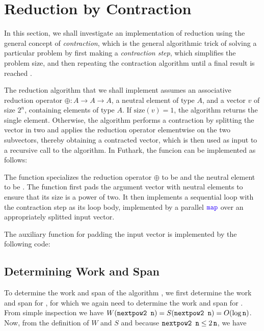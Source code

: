 \documentclass[oneside,11pt]{book}
\newenvironment{wrap}{\vspace{\topskip}\par\noindent\begin{minipage}{\linewidth}}{\end{minipage}\par}
\begin{document}
\section{Reduction by Contraction}

In this section, we shall investigate an implementation of reduction
using the general concept of \emph{contraction}, which is the general
algorithmic trick of solving a particular problem by first making a
\emph{contraction step}, which simplifies the problem size, and then
repeating the contraction algorithm until a final result is reached
\cite{algdesign:parseq2016}.

The reduction algorithm that we shall implement assumes an associative
reduction operator $\oplus : A \rightarrow A \rightarrow A$, a neutral
element of type $A$, and a vector $v$ of size $2^n$, containing
elements of type $A$. If $\mathrm{size}(v) = 1$, the algorithm returns
the single element. Otherwise, the algorithm performs a contraction by
splitting the vector in two and applies the reduction operator
elementwise on the two subvectors, thereby obtaining a contracted
vector, which is then used as input to a recursive call to the
algorithm. In Futhark, the funcion  can be implemented as
follows:

\begin{wrap}

\end{wrap}

\noindent
The function specializes the reduction operator $\oplus$ to be \kw{+}
and the neutral element to be . The function first pads the
argument vector  with neutral elements to ensure that its size
is a power of two. It then implements a sequential loop with the
contraction step as its loop body, implemented by a
parallel $\fop{map}$ over an appropriately splitted input vector.

The auxiliary function for padding the input vector is implemented by
the following code:

\begin{wrap}

\end{wrap}

\subsection{Determining Work and Span}

To determine the work and span of the algorithm , we first
determine the work and span for , for which we again need
to determine the work and span for . From simple
inspection we have $W(\texttt{nextpow2 n}) = S(\texttt{nextpow2 n}) =
O(\mathrm{log}\,\texttt{n})$. Now, from the definition of $W$ and $S$ and
because $\texttt{nextpow2 n} \leq 2\,\texttt{n}$, we have
\end{document}
